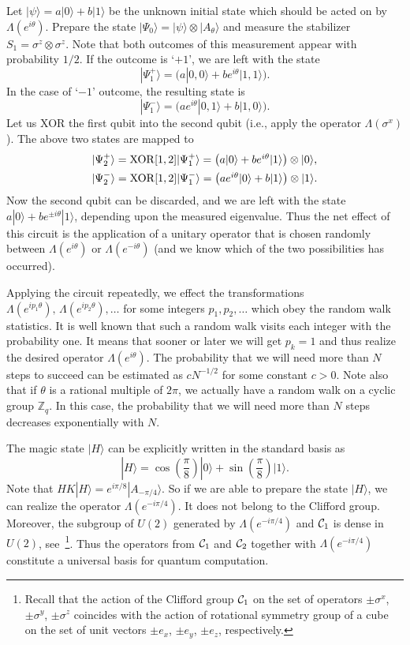 \documentclass[pra,twocolumn,showpacs]{revtex4}
\newcommand{\ZZ}{\mathbb{Z}}
\newcommand{\ra}{\rangle}
\newcommand*{\Cl}[1]{{\cal C}_{#1}}
\newcommand{\sx}{\sigma^x}
\newcommand{\sm}{\sigma}
\begin{document}
Let $|\psi\ra = a |0\ra + b |1\ra$ be the unknown initial state which should
be acted on by $\Lambda(e^{i\theta})$. Prepare the state
$|\Psi_0\ra=|\psi\ra\otimes|A_\theta\ra$ and measure the stabilizer
$S_1=\sm^z\otimes \sm^z$. Note that both outcomes of this measurement appear
with probability $1/2$. If the outcome is `$+1$', we are left with the state
\[
|\Psi_1^{+}\ra=\bigl(a |0,0\ra + b e^{i\theta} |1,1\ra\bigr).
\]
In the case of `$-1$' outcome, the resulting state is
\[
|\Psi_1^{-}\ra=\bigl(a e^{i\theta} |0,1\ra + b |1,0\ra\bigr).
\]
Let us XOR the first qubit into the second qubit (i.e., apply the operator
$\Lambda(\sx)$).  The above two states are mapped to
\[
\begin{array}{l}
|\Psi_2^{+}\ra= {\rm XOR}[1,2]|\Psi_1^{+}\ra =
\bigl(a |0\ra + b e^{i\theta} |1\ra\bigr)\otimes|0\ra,
\\[5pt]
|\Psi_2^{-}\ra= {\rm XOR}[1,2]|\Psi_1^{-}\ra =
\bigl(a e^{i\theta} |0\ra + b |1\ra\bigr)\otimes|1\ra.
\end{array}
\]
Now the second qubit can be discarded, and we are left with the state $a|0\ra
+ b e^{\pm i\theta}|1\ra$, depending upon the measured eigenvalue.  Thus the
net effect of this circuit is the application of a unitary operator that is
chosen randomly between $\Lambda(e^{i\theta})$ or $\Lambda(e^{-i\theta})$ (and
we know which of the two possibilities has occurred).

Applying the circuit repeatedly, we effect the transformations
$\Lambda(e^{ip_1\theta}),\,\Lambda(e^{ip_2\theta}),\ldots$ for some integers
$p_1,p_2,\ldots$ which obey the random walk statistics. It is well known that
such a random walk visits each integer with the probability one. It means that
sooner or later we will get $p_k=1$ and thus realize the desired operator
$\Lambda(e^{i\theta})$.  The probability that we will need more than $N$ steps
to succeed can be estimated as $c N^{-1/2}$ for some constant $c>0$.  Note
also that if $\theta$ is a rational multiple of $2\pi$, we actually have a
random walk on a cyclic group $\ZZ_q$.  In this case, the probability that we
will need more than $N$ steps decreases exponentially with $N$.


The magic state $|H\ra$ can be explicitly written in the standard basis as
\begin{equation}
\label{H-state}
|H\ra=\cos{\left(\frac{\pi}8\right)} |0\ra
+ \sin{\left(\frac{\pi}8\right)} |1\ra.
\end{equation}
Note that $HK|H\ra = e^{i\pi/8}|A_{-\pi/4}\ra$. So if we are able to prepare
the state $|H\ra$, we can realize the operator $\Lambda(e^{-i\pi/4})$.  It
does not belong to the Clifford group. Moreover, the subgroup of $U(2)$
generated by $\Lambda(e^{-i\pi/4})$ and $\Cl{1}$ is dense in $U(2)$,
see~\footnote{Recall that the action of the Clifford group $\Cl{1}$ on the set
of operators $\pm\sm^x$, $\pm\sm^y$, $\pm\sm^z$ coincides with the action of
rotational symmetry group of a cube on the set of unit vectors $\pm e_x$,
$\pm e_y$, $\pm e_z$, respectively.}. Thus the operators from $\Cl{1}$ and
$\Cl{2}$ together with $\Lambda(e^{-i\pi/4})$ constitute a universal basis
for quantum computation.
\end{document}
